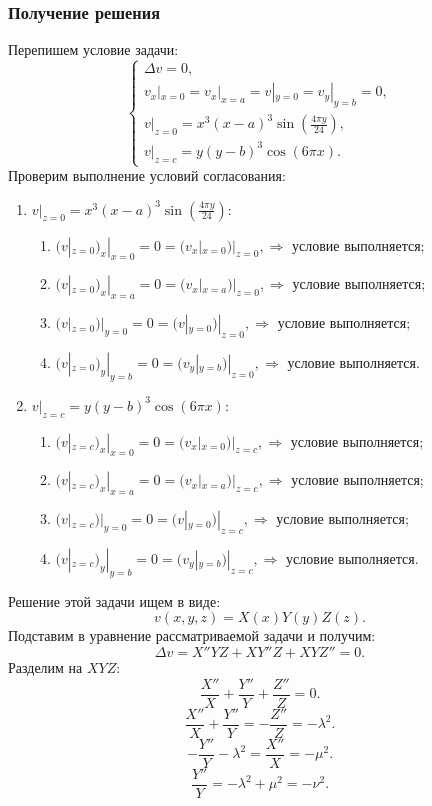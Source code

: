 \documentclass[11pt]{article}
\begin{document}
\subsubsection*{Получение решения}
Перепишем условие задачи:
$$\begin{cases}
    \Delta v=0,\\
    v_x|_{x=0}=v_x|_{x=a}=v|_{y=0}=v_y|_{y=b}=0,\\
    v|_{z=0}=x^3(x-a)^3\sin{(\frac{4\pi y}{24})},\\
    v|_{z=c}=y(y-b)^3\cos{({6\pi x})}.
\end{cases}$$
Проверим выполнение условий согласования:
\begin{enumerate}
    \item $v|_{z=0}=x^3(x-a)^3\sin{(\frac{4\pi y}{24})}:$
    \begin{enumerate}
        \item $(v|_{z=0})_x|_{x=0}=0=(v_x|_{x=0})|_{z=0}, \Rightarrow$ условие выполняется;
        \item $(v|_{z=0})_x|_{x=a}=0=(v_x|_{x=a})|_{z=0}, \Rightarrow$ условие выполняется;
        \item $(v|_{z=0})|_{y=0}=0=(v|_{y=0})|_{z=0}, \Rightarrow$ условие выполняется;
        \item $(v|_{z=0})_y|_{y=b}=0=(v_y|_{y=b})|_{z=0}, \Rightarrow$ условие выполняется.
    \end{enumerate}
    \item $v|_{z=c}=y(y-b)^3\cos{({6\pi x})}:$
    \begin{enumerate}
        \item $(v|_{z=c})_x|_{x=0}=0=(v_x|_{x=0})|_{z=c}, \Rightarrow$ условие выполняется;
        \item $(v|_{z=c})_x|_{x=a}=0=(v_x|_{x=a})|_{z=c}, \Rightarrow$ условие выполняется;
        \item $(v|_{z=c})|_{y=0}=0=(v|_{y=0})|_{z=c}, \Rightarrow$ условие выполняется;
        \item $(v|_{z=c})_y|_{y=b}=0=(v_y|_{y=b})|_{z=c}, \Rightarrow$ условие выполняется.
    \end{enumerate}
\end{enumerate}
Решение этой задачи ищем в виде:
$$v(x,y,z)=X(x)Y(y)Z(z).$$
Подставим в уравнение рассматриваемой задачи и получим:
$$\Delta v=X''YZ+XY''Z+XYZ''=0.$$
Разделим на $XYZ$:
$$\frac{X''}{X}+\frac{Y''}{Y}+\frac{Z''}{Z}=0.$$
$$\frac{X''}{X}+\frac{Y''}{Y}=-\frac{Z''}{Z}=-\lambda^2.$$
$$-\frac{Y''}{Y}-\lambda^2=\frac{X''}{X}=-\mu^2.$$
$$\frac{Y''}{Y}=-\lambda^2+\mu^2=-\nu^2.$$
\end{document}
